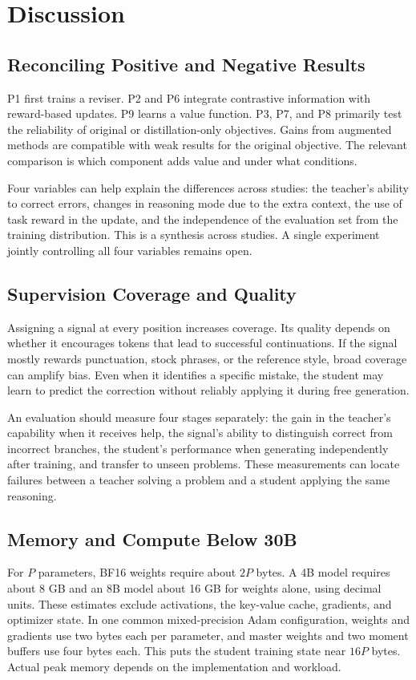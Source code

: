 \documentclass[11pt,a4paper]{article}
\begin{document}
\section{Discussion}
\subsection{Reconciling Positive and Negative Results}
P1 first trains a reviser. P2 and P6 integrate contrastive information with reward-based updates. P9 learns a value function. P3, P7, and P8 primarily test the reliability of original or distillation-only objectives. Gains from augmented methods are compatible with weak results for the original objective. The relevant comparison is which component adds value and under what conditions.

Four variables can help explain the differences across studies: the teacher's ability to correct errors, changes in reasoning mode due to the extra context, the use of task reward in the update, and the independence of the evaluation set from the training distribution. This is a synthesis across studies. A single experiment jointly controlling all four variables remains open.

\subsection{Supervision Coverage and Quality}
Assigning a signal at every position increases coverage. Its quality depends on whether it encourages tokens that lead to successful continuations. If the signal mostly rewards punctuation, stock phrases, or the reference style, broad coverage can amplify bias. Even when it identifies a specific mistake, the student may learn to predict the correction without reliably applying it during free generation.

An evaluation should measure four stages separately: the gain in the teacher's capability when it receives help, the signal's ability to distinguish correct from incorrect branches, the student's performance when generating independently after training, and transfer to unseen problems. These measurements can locate failures between a teacher solving a problem and a student applying the same reasoning.

\subsection{Memory and Compute Below 30B}
For \(P\) parameters, BF16 weights require about \(2P\) bytes. A 4B model requires about 8 GB and an 8B model about 16 GB for weights alone, using decimal units. These estimates exclude activations, the key-value cache, gradients, and optimizer state. In one common mixed-precision Adam configuration, weights and gradients use two bytes each per parameter, and master weights and two moment buffers use four bytes each. This puts the student training state near \(16P\) bytes. Actual peak memory depends on the implementation and workload.
\end{document}
